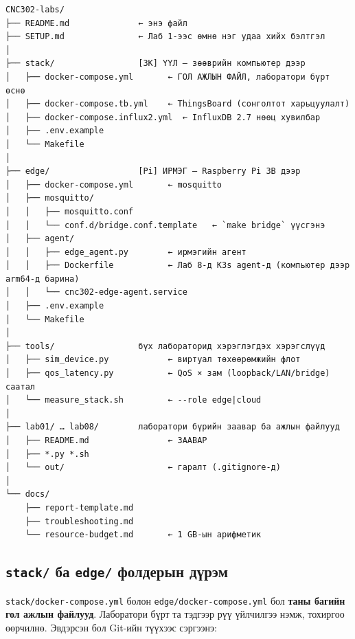 \begin{verbatim}
CNC302-labs/
├── README.md              ← энэ файл
├── SETUP.md               ← Лаб 1-ээс өмнө нэг удаа хийх бэлтгэл
│
├── stack/                 [ЗК] ҮҮЛ — зөөврийн компьютер дээр
│   ├── docker-compose.yml       ← ГОЛ АЖЛЫН ФАЙЛ, лаборатори бүрт өснө
│   ├── docker-compose.tb.yml    ← ThingsBoard (сонголтот харьцуулалт)
│   ├── docker-compose.influx2.yml  ← InfluxDB 2.7 нөөц хувилбар
│   ├── .env.example
│   └── Makefile
│
├── edge/                  [Pi] ИРМЭГ — Raspberry Pi 3B дээр
│   ├── docker-compose.yml       ← mosquitto
│   ├── mosquitto/
│   │   ├── mosquitto.conf
│   │   └── conf.d/bridge.conf.template   ← `make bridge` үүсгэнэ
│   ├── agent/
│   │   ├── edge_agent.py        ← ирмэгийн агент
│   │   ├── Dockerfile           ← Лаб 8-д K3s agent-д (компьютер дээр arm64-д барина)
│   │   └── cnc302-edge-agent.service
│   ├── .env.example
│   └── Makefile
│
├── tools/                 бүх лабораторид хэрэглэгдэх хэрэгслүүд
│   ├── sim_device.py            ← виртуал төхөөрөмжийн флот
│   ├── qos_latency.py           ← QoS × зам (loopback/LAN/bridge) саатал
│   └── measure_stack.sh         ← --role edge|cloud
│
├── lab01/ … lab08/        лаборатори бүрийн заавар ба ажлын файлууд
│   ├── README.md                ← ЗААВАР
│   ├── *.py *.sh
│   └── out/                     ← гаралт (.gitignore-д)
│
└── docs/
    ├── report-template.md
    ├── troubleshooting.md
    └── resource-budget.md       ← 1 GB-ын арифметик
\end{verbatim}

\hypertarget{stack-ux431ux430-edge-ux444ux43eux43bux434ux435ux440ux44bux43d-ux434ux4afux440ux44dux43c}{%
\subsection{\texorpdfstring{\texttt{stack/} ба \texttt{edge/} фолдерын дүрэм}{stack/ ба edge/ фолдерын дүрэм}}\label{stack-ux431ux430-edge-ux444ux43eux43bux434ux435ux440ux44bux43d-ux434ux4afux440ux44dux43c}}

\texttt{stack/\allowbreak{}docker-compose.\allowbreak{}yml} болон \texttt{edge/\allowbreak{}docker-compose.\allowbreak{}yml} бол \textbf{таны багийн гол ажлын файлууд}. Лаборатори бүрт та тэдгээр рүү үйлчилгээ нэмж, тохиргоо өөрчилнө. Эвдэрсэн бол Git-ийн түүхээс сэргээнэ:

\begin{Shaded}
\begin{Highlighting}[]
\OperatorTok{\textless{}}\OperatorTok{\textgreater{}}
\end{Highlighting}
\end{Shaded}

